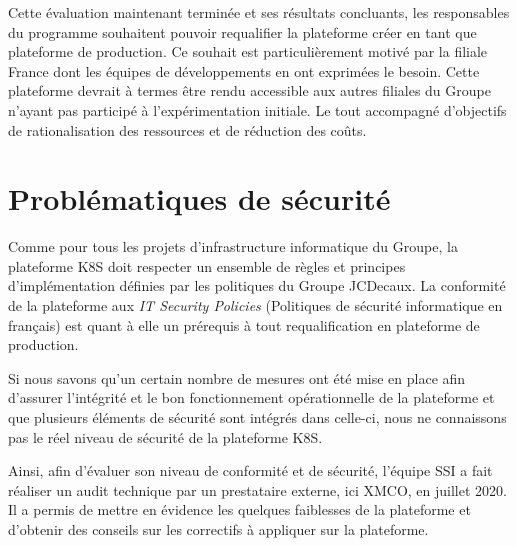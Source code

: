 Cette évaluation maintenant terminée et ses résultats concluants, les responsables du programme souhaitent pouvoir requalifier
la plateforme créer en tant que plateforme de production. Ce souhait est particulièrement motivé par la filiale France
dont les équipes de développements en ont exprimées le besoin.
\newline Cette plateforme devrait à termes être rendu accessible aux autres filiales du Groupe n'ayant pas participé à 
l'expérimentation initiale. Le tout accompagné d'objectifs de rationalisation des ressources et de réduction des coûts.

\newpage

\section{Problématiques de sécurité}
Comme pour tous les projets d'infrastructure informatique du Groupe, la plateforme \ac{K8S} doit respecter un ensemble de
règles et principes d'implémentation définies par les politiques du Groupe JCDecaux. La conformité de la plateforme aux
\emph{IT Security Policies} (\ie Politiques de sécurité informatique en français) est quant à elle un prérequis à tout
requalification en plateforme de production.

Si nous savons qu'un certain nombre de mesures ont été mise en place afin d'assurer l'intégrité et le bon fonctionnement
opérationnelle de la plateforme et que plusieurs éléments de sécurité sont intégrés dans celle-ci, nous ne connaissons pas
le réel niveau de sécurité de la plateforme \ac{K8S}.

Ainsi, afin d'évaluer son niveau de conformité et de sécurité, l'équipe \ac{SSI} a fait réaliser un audit technique par 
un prestataire externe, ici XMCO, en juillet 2020.
\newline Il a permis de mettre en évidence les quelques faiblesses de la plateforme et d'obtenir des conseils 
sur les correctifs à appliquer sur la plateforme.


